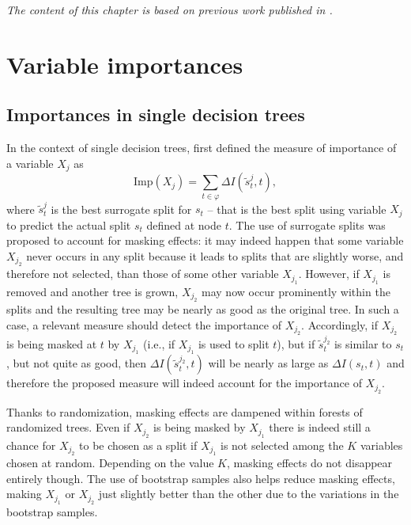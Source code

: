 \textit{The content of this chapter is based on previous work published in \citep{louppe:2013}.}



\section{Variable importances}
\label{sec:6:importances}

\subsection{Importances in single decision trees}

In the context of single decision trees, \cite{breiman:1984} first defined
the measure of importance of a variable $X_j$ as
\begin{equation}
\text{Imp}(X_j) = \sum_{t\in \varphi} \Delta I(\tilde{s}^j_t, t),
\end{equation}
where $\tilde{s}^j_t$ is the best surrogate split
for $s_t$ -- that is the best split using variable $X_j$ to predict the actual
split $s_t$ defined at node $t$. The use of surrogate splits was proposed to
account for masking effects: it may indeed happen that some variable $X_{j_2}$
never occurs in any split because it leads to splits that are slightly worse,
and therefore not selected, than those of some other variable $X_{j_1}$.
However, if $X_{j_1}$ is removed and another tree is grown, $X_{j_2}$ may now
occur prominently within the splits and the resulting tree may be nearly as good
as the original tree. In such a case, a relevant measure should detect the
importance of $X_{j_2}$. Accordingly, if $X_{j_2}$ is being masked at $t$ by
$X_{j_1}$ (i.e., if $X_{j_1}$ is used to split $t$), but if $\tilde{s}^{j_2}_t$ is similar to
$s_t$, but not quite as good, then $\Delta I(\tilde{s}^{j_2}_t, t)$ will be
nearly as large as $\Delta I(s_t, t)$ and therefore the proposed measure will
indeed account for the importance of $X_{j_2}$.

Thanks to randomization, masking effects are dampened within forests of
randomized trees. Even if $X_{j_2}$ is being masked by $X_{j_1}$ there is indeed
still a chance for $X_{j_2}$ to be chosen as a split if $X_{j_1}$ is not
selected among the $K$ variables chosen at random. Depending on the value $K$,
masking effects do not disappear entirely though. The use of bootstrap samples
also helps reduce masking effects, making $X_{j_1}$ or $X_{j_2}$ just slightly
better than the other due to the variations in the bootstrap samples.

